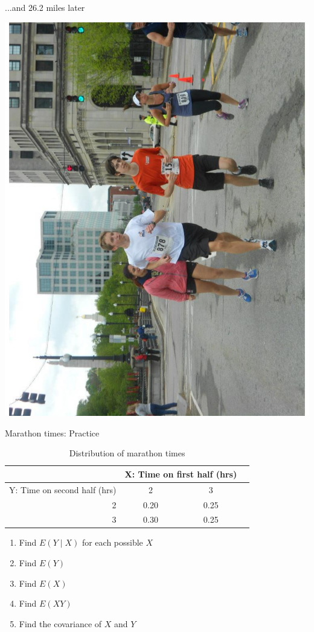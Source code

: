 \documentclass{beamer}
\begin{document}
\begin{frame}{...and 26.2 miles later}
\begin{center}
\includegraphics[angle=270,scale=.3]{figures/PostMarathon.pdf}
\end{center}
\end{frame}

\begin{frame}{Marathon times: Practice}
\begin{table}[ht]
\centering
\begin{tabular}{rccc}
 & \multicolumn{2}{c}{X: Time on first half (hrs)} \\
  \hline
Y: Time on second half (hrs) & 2 & 3 \\ 
  \hline
2 & 0.20 & 0.25 \\ 
  3 & 0.30 & 0.25 \\ 
   \hline
   \hline
\end{tabular}
\caption{Distribution of marathon times} 
\end{table}
\begin{enumerate}
\item Find $E(Y\mid X)$ for each possible $X$
\item Find $E(Y)$
\item Find $E(X)$
\item Find $E(XY)$
\item Find the covariance of $X$ and $Y$
\end{enumerate}
\end{frame}
\end{document}
